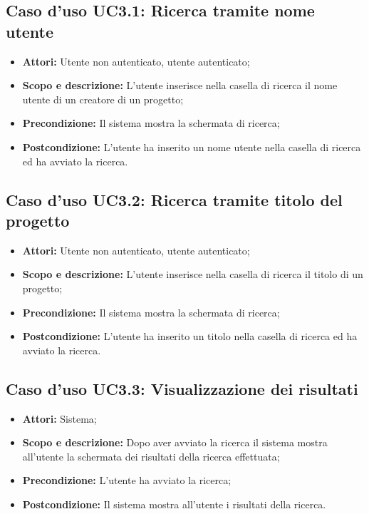 \subsection{Caso d'uso UC3.1: Ricerca tramite nome utente}
\begin{itemize}
	\item \textbf{Attori:} Utente non autenticato, utente autenticato;
	\item \textbf{Scopo e descrizione:} L'utente inserisce nella casella di ricerca il nome utente di un creatore di un progetto;
	\item \textbf{Precondizione:} Il sistema mostra la schermata di ricerca;
	\item \textbf{Postcondizione:} L'utente ha inserito un nome utente nella casella di ricerca ed ha avviato la ricerca.
\end{itemize}

\subsection{Caso d'uso UC3.2: Ricerca tramite titolo del progetto}
\begin{itemize}
	\item \textbf{Attori:} Utente non autenticato, utente autenticato;
	\item \textbf{Scopo e descrizione:} L'utente inserisce nella casella di ricerca il titolo di un progetto;
	\item \textbf{Precondizione:} Il sistema mostra la schermata di ricerca;
	\item \textbf{Postcondizione:} L'utente ha inserito un titolo nella casella di ricerca ed ha avviato la ricerca.
\end{itemize}

\subsection{Caso d'uso UC3.3: Visualizzazione dei risultati}
\begin{itemize}
	\item \textbf{Attori:} Sistema;
	\item \textbf{Scopo e descrizione:} Dopo aver avviato la ricerca il sistema mostra all'utente la schermata dei risultati della ricerca effettuata;
	\item \textbf{Precondizione:} L'utente ha avviato la ricerca;
	\item \textbf{Postcondizione:} Il sistema mostra all'utente i risultati della ricerca.
\end{itemize}

